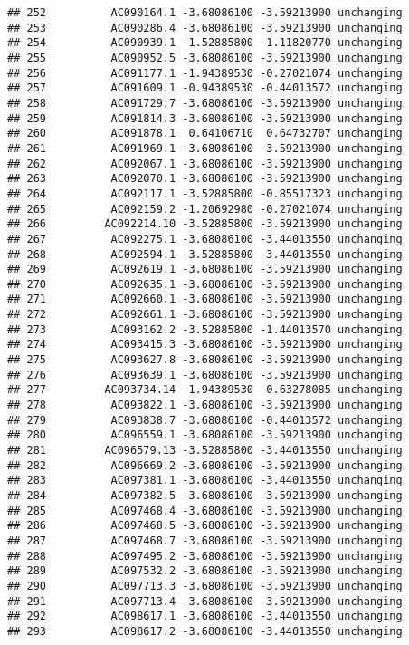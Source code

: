 \documentclass[]{article}
\begin{document}
\begin{verbatim}
## 252          AC090164.1 -3.68086100 -3.59213900 unchanging
## 253          AC090286.4 -3.68086100 -3.59213900 unchanging
## 254          AC090939.1 -1.52885800 -1.11820770 unchanging
## 255          AC090952.5 -3.68086100 -3.59213900 unchanging
## 256          AC091177.1 -1.94389530 -0.27021074 unchanging
## 257          AC091609.1 -0.94389530 -0.44013572 unchanging
## 258          AC091729.7 -3.68086100 -3.59213900 unchanging
## 259          AC091814.3 -3.68086100 -3.59213900 unchanging
## 260          AC091878.1  0.64106710  0.64732707 unchanging
## 261          AC091969.1 -3.68086100 -3.59213900 unchanging
## 262          AC092067.1 -3.68086100 -3.59213900 unchanging
## 263          AC092070.1 -3.68086100 -3.59213900 unchanging
## 264          AC092117.1 -3.52885800 -0.85517323 unchanging
## 265          AC092159.2 -1.20692980 -0.27021074 unchanging
## 266         AC092214.10 -3.52885800 -3.59213900 unchanging
## 267          AC092275.1 -3.68086100 -3.44013550 unchanging
## 268          AC092594.1 -3.52885800 -3.44013550 unchanging
## 269          AC092619.1 -3.68086100 -3.59213900 unchanging
## 270          AC092635.1 -3.68086100 -3.59213900 unchanging
## 271          AC092660.1 -3.68086100 -3.59213900 unchanging
## 272          AC092661.1 -3.68086100 -3.59213900 unchanging
## 273          AC093162.2 -3.52885800 -1.44013570 unchanging
## 274          AC093415.3 -3.68086100 -3.59213900 unchanging
## 275          AC093627.8 -3.68086100 -3.59213900 unchanging
## 276          AC093639.1 -3.68086100 -3.59213900 unchanging
## 277         AC093734.14 -1.94389530 -0.63278085 unchanging
## 278          AC093822.1 -3.68086100 -3.59213900 unchanging
## 279          AC093838.7 -3.68086100 -0.44013572 unchanging
## 280          AC096559.1 -3.68086100 -3.59213900 unchanging
## 281         AC096579.13 -3.52885800 -3.44013550 unchanging
## 282          AC096669.2 -3.68086100 -3.59213900 unchanging
## 283          AC097381.1 -3.68086100 -3.44013550 unchanging
## 284          AC097382.5 -3.68086100 -3.59213900 unchanging
## 285          AC097468.4 -3.68086100 -3.59213900 unchanging
## 286          AC097468.5 -3.68086100 -3.59213900 unchanging
## 287          AC097468.7 -3.68086100 -3.59213900 unchanging
## 288          AC097495.2 -3.68086100 -3.59213900 unchanging
## 289          AC097532.2 -3.68086100 -3.59213900 unchanging
## 290          AC097713.3 -3.68086100 -3.59213900 unchanging
## 291          AC097713.4 -3.68086100 -3.59213900 unchanging
## 292          AC098617.1 -3.68086100 -3.44013550 unchanging
## 293          AC098617.2 -3.68086100 -3.44013550 unchanging

\end{verbatim}
\end{document}
